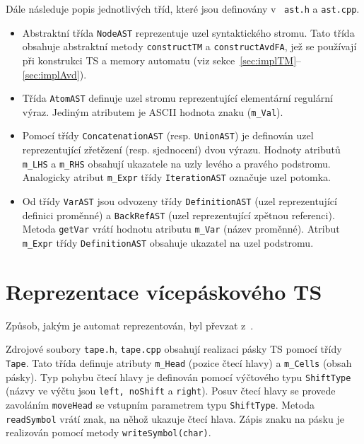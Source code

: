 \documentclass[thesis=B,czech]{FITthesis}[2019/12/23]
\theoremstyle{definition}
\begin{document}
Dále následuje popis jednotlivých tříd, které jsou definovány v~ \texttt{ast.h} a \texttt{ast.cpp}.
\begin{itemize}
	\item{Abstraktní třída \texttt{NodeAST} reprezentuje uzel syntaktického stromu. Tato třída obsahuje abstraktní metody \texttt{constructTM} a \texttt{constructAvdFA}, jež se používají při konstrukci TS a memory automatu (viz sekce~\ref{sec:implTM}--\ref{sec:implAvd}).} 
	\item{Třída \texttt{AtomAST} definuje uzel stromu reprezentující elementární regulární výraz. Jediným atributem je ASCII hodnota znaku (\texttt{m\_Val}).}  
	\item{Pomocí třídy \texttt{ConcatenationAST} (resp. \texttt{UnionAST}) je definován uzel reprezentující zřetězení (resp. sjednocení) dvou výrazu. Hodnoty atributů \texttt{m\_LHS} a \texttt{m\_RHS} obsahují ukazatele na uzly levého a pravého podstromu. Analogicky atribut \texttt{m\_Expr} třídy \texttt{IterationAST} označuje uzel potomka.}
	\item{Od třídy \texttt{VarAST} jsou odvozeny třídy \texttt{DefinitionAST} (uzel reprezentující definici proměnné) a \texttt{BackRefAST} (uzel reprezentující zpětnou referenci). Metoda \texttt{getVar} vrátí hodnotu atributu \texttt{m\_Var} (název proměnné). Atribut \texttt{m\_Expr} třídy \texttt{DefinitionAST} obsahuje ukazatel na uzel podstromu.}
\end{itemize}

\section{Reprezentace vícepáskového TS}
Způsob, jakým je automat reprezentován, byl převzat z~\cite{ndtmsim}. 

Zdrojové soubory \texttt{tape.h}, \texttt{tape.cpp} obsahují realizaci pásky TS pomocí třídy \texttt{Tape}. Tato třída definuje atributy \texttt{m\_Head} (pozice čtecí hlavy) a \texttt{m\_Cells} (obsah pásky). Typ pohybu čtecí hlavy je definován pomocí výčtového typu \texttt{ShiftType} (názvy ve výčtu jsou \texttt{left, noShift} a \texttt{right}). Posuv čtecí hlavy se provede zavoláním \texttt{moveHead} se vstupním parametrem typu \texttt{ShiftType}. Metoda \texttt{readSymbol} vrátí znak, na něhož ukazuje čtecí hlava. Zápis znaku na pásku je realizován pomocí metody \texttt{writeSymbol(char)}. 
\end{document}
